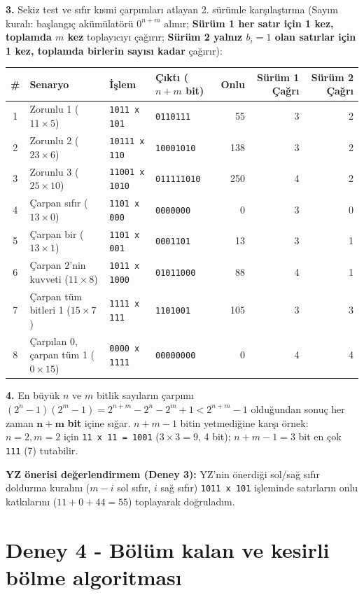 \documentclass[10pt,a4paper]{article}
\begin{document}
\newpage

\textbf{3.} Sekiz test ve sıfır kısmi çarpımları atlayan 2. sürümle karşılaştırma (Sayım kuralı: başlangıç akümülatörü $0^{n+m}$ alınır; \textbf{Sürüm 1 her satır için 1 kez, toplamda $m$ kez} toplayıcıyı çağırır; \textbf{Sürüm 2 yalnız $b_i=1$ olan satırlar için 1 kez, toplamda birlerin sayısı kadar} çağırır):

\begin{center}
\small
\begin{tabular}{clllrrr}
\toprule
\# & Senaryo & İşlem & Çıktı ($n+m$ bit) & Onlu & Sürüm 1 Çağrı & Sürüm 2 Çağrı \\
\midrule
1 & Zorunlu 1 ($11 \times 5$) & \texttt{1011 x 101} & \texttt{0110111} & 55 & 3 & 2 \\
2 & Zorunlu 2 ($23 \times 6$) & \texttt{10111 x 110} & \texttt{10001010} & 138 & 3 & 2 \\
3 & Zorunlu 3 ($25 \times 10$) & \texttt{11001 x 1010} & \texttt{011111010} & 250 & 4 & 2 \\
4 & Çarpan sıfır ($13 \times 0$) & \texttt{1101 x 000} & \texttt{0000000} & 0 & 3 & 0 \\
5 & Çarpan bir ($13 \times 1$) & \texttt{1101 x 001} & \texttt{0001101} & 13 & 3 & 1 \\
6 & Çarpan $2$'nin kuvveti ($11 \times 8$) & \texttt{1011 x 1000} & \texttt{01011000} & 88 & 4 & 1 \\
7 & Çarpan tüm bitleri 1 ($15 \times 7$) & \texttt{1111 x 111} & \texttt{1101001} & 105 & 3 & 3 \\
8 & Çarpılan 0, çarpan tüm 1 ($0 \times 15$) & \texttt{0000 x 1111} & \texttt{00000000} & 0 & 4 & 4 \\
\bottomrule
\end{tabular}
\end{center}

\textbf{4.} En büyük $n$ ve $m$ bitlik sayıların çarpımı $(2^n - 1)(2^m - 1) = 2^{n+m} - 2^n - 2^m + 1 < 2^{n+m} - 1$ olduğundan sonuç her zaman $\mathbf{n+m}$ \textbf{bit} içine sığar. $n+m-1$ bitin yetmediğine karşı örnek: $n=2, m=2$ için \texttt{11 x 11 = 1001} ($3 \times 3 = 9$, 4 bit); $n+m-1 = 3$ bit en çok \texttt{111} (7) tutabilir.

\textbf{YZ önerisi değerlendirmem (Deney 3):} YZ'nin önerdiği sol/sağ sıfır doldurma kuralını ($m-i$ sol sıfır, $i$ sağ sıfır) \texttt{1011 x 101} işleminde satırların onlu katkılarını ($11 + 0 + 44 = 55$) toplayarak doğruladım.

\section*{Deney 4 - Bölüm kalan ve kesirli bölme algoritması}
\end{document}
